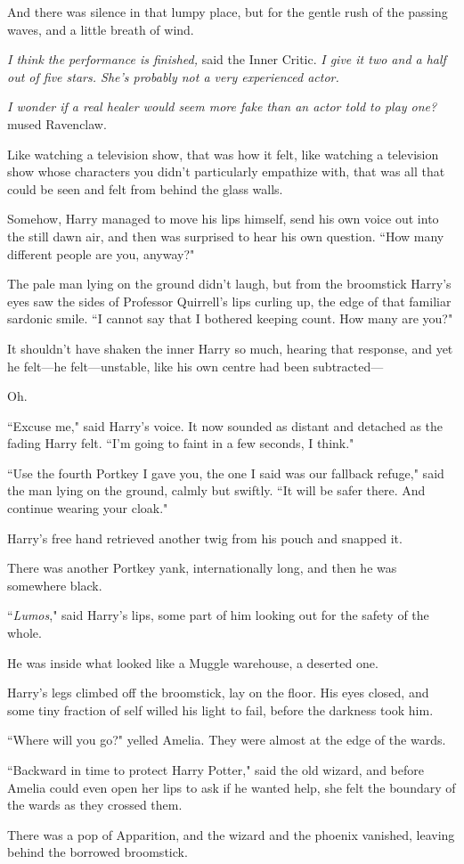 And there was silence in that lumpy place, but for the gentle rush of the passing waves, and a little breath of wind.

\emph{I think the performance is finished,} said the Inner Critic. \emph{I give it two and a half out of five stars. She's probably not a very experienced actor.}

\emph{I wonder if a real healer would seem more fake than an actor told to play one?} mused Ravenclaw.

Like watching a television show, that was how it felt, like watching a television show whose characters you didn't particularly empathize with, that was all that could be seen and felt from behind the glass walls.

Somehow, Harry managed to move his lips himself, send his own voice out into the still dawn air, and then was surprised to hear his own question. ``How many different people are you, anyway?"

The pale man lying on the ground didn't laugh, but from the broomstick Harry's eyes saw the sides of Professor Quirrell's lips curling up, the edge of that familiar sardonic smile. ``I cannot say that I bothered keeping count. How many are you?"

It shouldn't have shaken the inner Harry so much, hearing that response, and yet he felt---he felt---unstable, like his own centre had been subtracted---

Oh.

``Excuse me," said Harry's voice. It now sounded as distant and detached as the fading Harry felt. ``I'm going to faint in a few seconds, I think."

``Use the fourth Portkey I gave you, the one I said was our fallback refuge," said the man lying on the ground, calmly but swiftly. ``It will be safer there. And continue wearing your cloak."

Harry's free hand retrieved another twig from his pouch and snapped it.

There was another Portkey yank, internationally long, and then he was somewhere black.

``\emph{Lumos}," said Harry's lips, some part of him looking out for the safety of the whole.

He was inside what looked like a Muggle warehouse, a deserted one.

Harry's legs climbed off the broomstick, lay on the floor. His eyes closed, and some tiny fraction of self willed his light to fail, before the darkness took him.

\later

``Where will you go?" yelled Amelia. They were almost at the edge of the wards.

``Backward in time to protect Harry Potter," said the old wizard, and before Amelia could even open her lips to ask if he wanted help, she felt the boundary of the wards as they crossed them.

There was a pop of Apparition, and the wizard and the phoenix vanished, leaving behind the borrowed broomstick.


